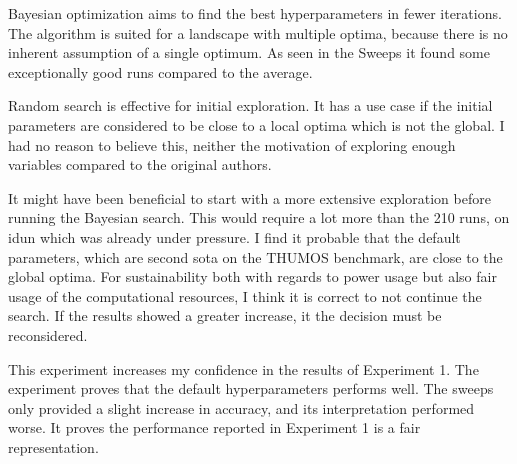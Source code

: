 
Bayesian optimization aims to find the best hyperparameters in fewer iterations. The algorithm is suited for a landscape with multiple optima, because there is no inherent assumption of a single optimum. As seen in the Sweeps it found some exceptionally good runs compared to the average. 

Random search is effective for initial exploration. It has a use case if the initial parameters are considered to be close to a local optima which is not the global. I had no reason to believe this, neither the motivation of exploring enough variables compared to the original authors\cite{li_videomamba_2024}.


It might have been beneficial to start with a more extensive exploration before running the Bayesian search. This would require a lot more than the 210 runs, on \acrshort{idun} which was already under pressure. I find it probable that the default parameters, which are second \acrshort{sota} on the THUMOS benchmark, are close to the global optima. For sustainability both with regards to power usage but also fair usage of the computational resources, I think it is correct to not continue the search. If the results showed a greater increase, it the decision must be reconsidered.




This experiment increases my confidence in the results of Experiment 1. The experiment proves that the default hyperparameters performs well. The sweeps only provided a slight increase in accuracy, and its interpretation performed worse. It proves the performance reported in Experiment 1 is a fair representation.

